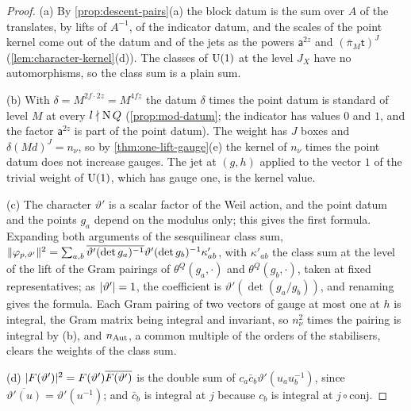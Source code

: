 \begin{proof}
(a) By \cref{prop:descent-pairs}(a) the block datum is the sum over $A$ of the translates, by lifts of $A^{-1}$, of the indicator datum, and the scales of the point kernel come out of the datum and of the jets as the powers
$\mathsf a^{2z}$ and $(\bar\pi_M\mathsf t)^J$ (\cref{lem:character-kernel}(d)). The classes of $\operatorname{U}(1)$ at the level $J_X$ have no automorphisms, so the class sum is a plain sum.

(b) With $\delta=M^{2f\cdot2z}=M^{4fz}$ the datum $\delta$ times the point datum is standard of level $M$ at every $l\nmid\operatorname{N} Q$ (\cref{prop:mod-datum}; the indicator has values $0$ and $1$, and the factor $\mathsf a^{2z}$ is part of the
point datum). The weight has $J$ boxes and $\delta(Md)^J=n_\nu$, so by \cref{thm:one-lift-gauge}(e) the kernel of $n_\nu$ times the point datum does not increase gauges. The jet at $(g,h)$ applied to the vector $1$ of the trivial weight of $\operatorname{U}(1)$, which has gauge one, is the
kernel value.

(c) The character $\vartheta'$ is a scalar factor of the Weil action, and the point datum and the points $g_a$ depend on the modulus only; this gives the first formula. Expanding both arguments of the sesquilinear class sum,
$\lVert \varphi_{p,\vartheta'}\rVert^2=\sum_{a,b}\overline{\vartheta'(\det g_a)^{-1}}\vartheta'(\det g_b)^{-1}\kappa'_{ab}$, with $\kappa'_{ab}$ the class sum at the level of the lift of the Gram pairings of $\theta^Q(g_a,\cdot)$ and $\theta^Q(g_b,\cdot)$, taken at fixed
representatives; as $\lvert \vartheta'\rvert=1$, the coefficient is $\vartheta'(\det(g_a/g_b))$, and renaming gives the formula. Each Gram pairing of two vectors of gauge at most one at $h$ is integral, the Gram matrix being integral and invariant, so
$n_\nu^2$ times the pairing is integral by (b), and $n_{\rm Aut}$, a common multiple of the orders of the stabilisers, clears the weights of the class sum.

(d) $\lvert F(\vartheta')\rvert^2=F(\vartheta')\overline{F(\vartheta')}$ is the double sum of $c_a\bar c_b\vartheta'(u_au_b^{-1})$, since $\overline{\vartheta'(u)}=\vartheta'(u^{-1})$; and $\bar c_b$ is integral at $j$ because $c_b$ is integral at $j\circ\mathrm{conj}$.
\end{proof}

